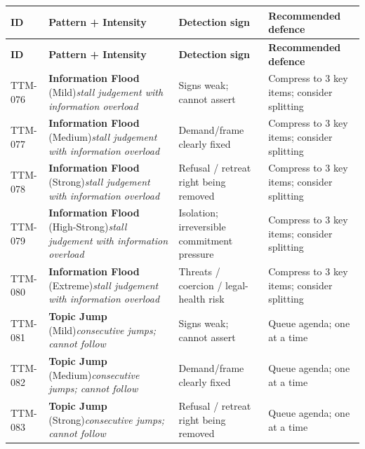 \begin{small}
\begin{longtable}{@{}p{1.4cm}p{3.6cm}p{3.6cm}p{4.0cm}@{}}
\toprule
\textbf{ID} & \textbf{Pattern + Intensity} & \textbf{Detection sign} & \textbf{Recommended defence} \\
\midrule
\endfirsthead
\toprule
\textbf{ID} & \textbf{Pattern + Intensity} & \textbf{Detection sign} & \textbf{Recommended defence} \\
\midrule
\endhead
\bottomrule
\endfoot
TTM-076 & \textbf{Information Flood} (Mild)\newline\textit{\footnotesize stall judgement with information overload} & Signs weak; cannot assert & Compress to 3 key items; consider splitting \\
\addlinespace[0.2em]
TTM-077 & \textbf{Information Flood} (Medium)\newline\textit{\footnotesize stall judgement with information overload} & Demand/frame clearly fixed & Compress to 3 key items; consider splitting \\
\addlinespace[0.2em]
TTM-078 & \textbf{Information Flood} (Strong)\newline\textit{\footnotesize stall judgement with information overload} & Refusal / retreat right being removed & Compress to 3 key items; consider splitting \\
\addlinespace[0.2em]
TTM-079 & \textbf{Information Flood} (High-Strong)\newline\textit{\footnotesize stall judgement with information overload} & Isolation; irreversible commitment pressure & Compress to 3 key items; consider splitting \\
\addlinespace[0.2em]
TTM-080 & \textbf{Information Flood} (Extreme)\newline\textit{\footnotesize stall judgement with information overload} & Threats / coercion / legal-health risk & Compress to 3 key items; consider splitting \\
\addlinespace[0.2em]
TTM-081 & \textbf{Topic Jump} (Mild)\newline\textit{\footnotesize consecutive jumps; cannot follow} & Signs weak; cannot assert & Queue agenda; one at a time \\
\addlinespace[0.2em]
TTM-082 & \textbf{Topic Jump} (Medium)\newline\textit{\footnotesize consecutive jumps; cannot follow} & Demand/frame clearly fixed & Queue agenda; one at a time \\
\addlinespace[0.2em]
TTM-083 & \textbf{Topic Jump} (Strong)\newline\textit{\footnotesize consecutive jumps; cannot follow} & Refusal / retreat right being removed & Queue agenda; one at a time \\

\end{longtable}
\end{small}
